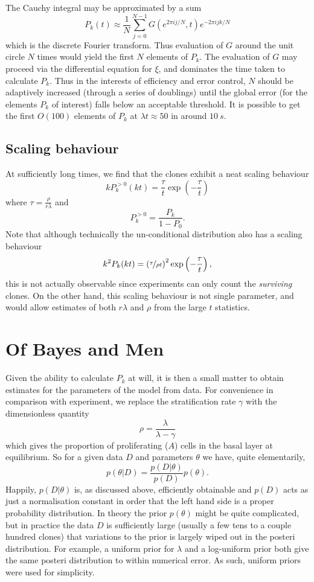 \documentclass[10pt,english]{article}
\begin{document}
The Cauchy integral may be approximated by a sum \[P_k(t) \approx \frac{1}{N} \sum_{j=0}^{N-1} G\left(e^{2\pi i j/N},t\right) e^{-2\pi i j k /N}\] which is the discrete Fourier transform. Thus evaluation of $G$ around the unit circle $N$ times would yield the first $N$ elements of $P_k$. The evaluation of $G$ may proceed via the differential equation for $\xi$, and dominates the time taken to calculate $P_k$. Thus in the interests of efficiency and error control, $N$ should be adaptively increased (through a series of doublings) until the global error (for the elements $P_k$ of interest) falls below an acceptable threshold. It is possible to get the first $O(100)$ elements of $P_k$ at $\lambda t \approx 50$ in around $\SI{10}{s}$.

\subsection{Scaling behaviour}

At sufficiently long times, we find that the clones exhibit a neat scaling behaviour \[k P^{>0}_k(k t) = \frac{\tau}{t}\exp\left(-\frac{\tau}{t}\right)\] where $\tau = \frac{\rho}{r\lambda}$ and \[P^{>0}_k = \frac{P_k}{1-P_0}.\] Note that although technically the un-conditional distribution also has a scaling behaviour \[k^2 P_k(k t) = \left(\nicefrac{\tau}{\rho t}\right)^2\exp\left(-\frac{\tau}{t}\right),\] this is not actually observable since experiments can only count the \emph{surviving} clones. On the other hand, this scaling behaviour is not single parameter, and would allow estimates of both $r\lambda$ and $\rho$ from the large $t$ statistics.

\section{Of Bayes and Men}

Given the ability to calculate $P_k$ at will, it is then a small matter to obtain estimates for the parameters of the model from data. For convenience in comparison with experiment, we replace the stratification rate $\gamma$ with the dimensionless quantity \[\rho = \frac{\lambda}{\lambda - \gamma}\] which gives the proportion of proliferating ($A$) cells in the basal layer at equilibrium. So for a given data $D$ and parameters $\theta$ we have, quite elementarily, \[p(\theta|D) = \frac{p(D|\theta)}{p(D)} p(\theta).\] Happily, $p(D|\theta)$ is, as discussed above, efficiently obtainable and $p(D)$ acts as just a normalisation constant in order that the left hand side is a proper probability distribution. In theory the prior $p(\theta)$ might be quite complicated, but in practice the data $D$ is sufficiently large (usually a few tens to a couple hundred clones) that variations to the prior is largely wiped out in the posteri distribution. For example, a uniform prior for $\lambda$ and a log-uniform prior both give the same posteri distribution to within numerical error. As such, uniform priors were used for simplicity. 
\end{document}
